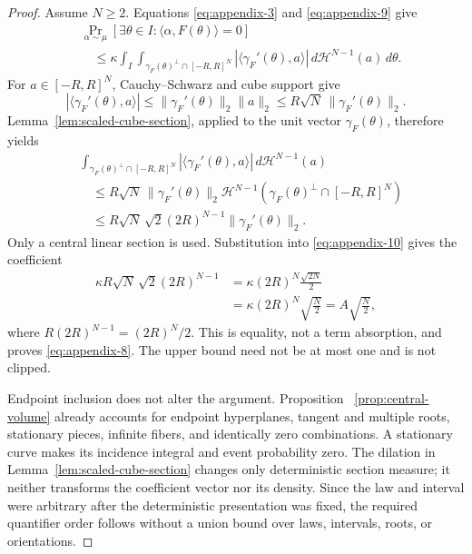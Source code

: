 \begin{proof}
Assume $N\geq2$.  Equations \eqref{eq:appendix-3} and \eqref{eq:appendix-9} give
\begin{equation}
\begin{aligned}
&\Pr_{\alpha\sim\mu}
[\exists\theta\in I:\langle\alpha,F(\theta)\rangle=0]\\
&\quad\leq\kappa\int_I
\int_{\gamma_F(\theta)^\perp\cap[-R,R]^N}
|\langle\gamma_F'(\theta),a\rangle|
\,d\mathcal H^{N-1}(a)\,d\theta.
\end{aligned}
\label{eq:appendix-10}
\end{equation}
For $a\in[-R,R]^N$, Cauchy--Schwarz
\citep{rudin1976principles} and cube support give
\begin{equation}
|\langle\gamma_F'(\theta),a\rangle|
\leq\|\gamma_F'(\theta)\|_2\|a\|_2
\leq R\sqrt N\,\|\gamma_F'(\theta)\|_2.
\label{eq:appendix-11}
\end{equation}
Lemma~\ref{lem:scaled-cube-section}, applied to the unit vector
$\gamma_F(\theta)$, therefore yields
\begin{equation}
\begin{aligned}
&\int_{\gamma_F(\theta)^\perp\cap[-R,R]^N}
|\langle\gamma_F'(\theta),a\rangle|
\,d\mathcal H^{N-1}(a)\\
&\quad\leq
R\sqrt N\,\|\gamma_F'(\theta)\|_2
\mathcal H^{N-1}(\gamma_F(\theta)^\perp\cap[-R,R]^N)\\
&\quad\leq
R\sqrt N\,\sqrt2(2R)^{N-1}
\|\gamma_F'(\theta)\|_2.
\end{aligned}
\label{eq:appendix-12}
\end{equation}
Only a central linear section is used.  Substitution into \eqref{eq:appendix-10} gives the
coefficient
\begin{equation}
\begin{aligned}
\kappa R\sqrt N\,\sqrt2(2R)^{N-1}
&=\kappa(2R)^N\frac{\sqrt{2N}}2\\
&=\kappa(2R)^N\sqrt{\frac N2}
=A\sqrt{\frac N2},
\end{aligned}
\label{eq:appendix-13}
\end{equation}
where $R(2R)^{N-1}=(2R)^N/2$.  This is equality, not a term absorption, and
proves \eqref{eq:appendix-8}.  The upper bound need not be at most one and is not clipped.

Endpoint inclusion does not alter the argument.  Proposition
~\ref{prop:central-volume} already accounts for endpoint hyperplanes, tangent
and multiple roots, stationary pieces, infinite fibers, and identically zero
combinations.  A stationary curve makes its incidence integral and event
probability zero.  The dilation in Lemma~\ref{lem:scaled-cube-section}
changes only deterministic section measure; it neither transforms the
coefficient vector nor its density.  Since the law and interval were
arbitrary after the deterministic presentation was fixed, the required
quantifier order follows without a union bound over laws, intervals, roots,
or orientations.
\end{proof}

